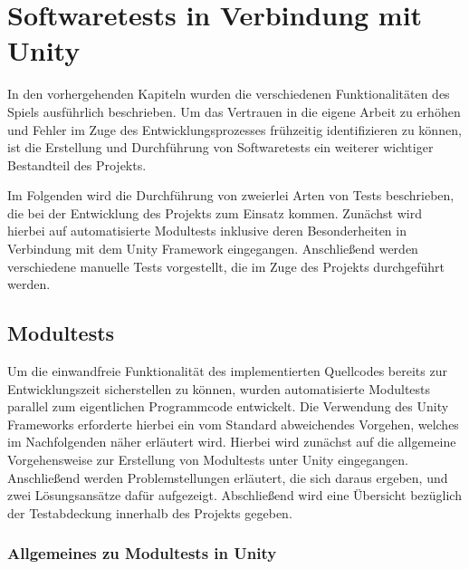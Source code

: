 \section{Softwaretests in Verbindung mit Unity}
\label{sec:testing}

In den vorhergehenden Kapiteln wurden die verschiedenen Funktionalitäten des Spiels ausführ\-lich beschrieben. Um das Vertrauen in die eigene Arbeit zu erhöhen und Fehler im Zuge des Entwicklungsprozesses frühzeitig identifizieren zu können, ist die Erstellung und Durchführung von Softwaretests ein weiterer wichtiger Bestandteil des Projekts. 


Im Folgenden wird die Durchführung von zweierlei Arten von Tests beschrieben, die bei der Entwicklung des Projekts zum Einsatz kommen. Zunächst wird hierbei auf automatisierte Modultests inklusive deren Besonderheiten in Verbindung mit dem Unity Framework eingegangen. Anschließend werden verschiedene manuelle Tests vorgestellt, die im Zuge des Projekts durchgeführt werden.  

\subsection{Modultests}

Um die einwandfreie Funktionalität des implementierten Quellcodes bereits zur Entwicklungszeit
sicherstellen zu können, wurden automatisierte Modultests parallel zum eigentlichen
Programmcode entwickelt. Die Verwendung des Unity Frameworks erforderte hierbei ein vom Standard abweichendes Vorgehen, welches im Nachfolgenden näher erläutert wird. Hierbei wird zunächst auf die allgemeine Vorgehensweise zur Erstellung von Modultests unter Unity eingegangen. Anschließend werden Problemstellungen erläutert, die sich daraus ergeben, und zwei Lösungsansätze dafür aufgezeigt. Abschließend wird eine Übersicht bezüglich der Testabdeckung innerhalb des Projekts gegeben. 

\subsubsection{Allgemeines zu Modultests in Unity}

